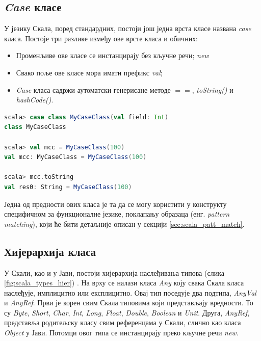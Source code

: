 \documentclass[12pt,oneside]{memoir}
\begin{document}
\subsection{\textit{Case} класе}
\label{subsec:scala_case_klase}

У језику Скала, поред стандардних, постоји још једна врста класе названа \textit{case} класа. Постоје три разлике између ове врсте класа и обичних:

\begin{itemize} 
\item Променљиве ове класе се инстанцирају без кључне речи; \textit{new}
\item Свако поље ове класе мора имати префикс \textit{val};
\item \textit{Case} класа садржи аутоматски генерисане методе $==$, \textit{toString()} и \textit{hashCode()}.
\end{itemize}

\begin{lstlisting}[language=Scala, caption={Пример коришћења \textit{case} класа}, label={lst:scala_oop_case_class_example}]
scala> case class MyCaseClass(val field: Int)
class MyCaseClass

scala> val mcc = MyCaseClass(100)
val mcc: MyCaseClass = MyCaseClass(100)

scala> mcc.toString
val res0: String = MyCaseClass(100)
\end{lstlisting}

Једна од предности ових класа је та да се могу користити у конструкту специфичном за функционалне језике, поклапању образаца (енг. \textit{pattern matching}), који ће бити детаљније описан у секцији \ref{sec:scala_patt_match}.

\subsection{Хијерархија класа}
\label{subsec:scala_class_hier}

У Скали, као и у Јави, постоји хијерархија наслеђивања типова (слика \ref{fig:scala_types_hier}) \cite{scala_prog}. На врху се налази класа \textit{Any} коју свака Скала класа наслеђује, имплицитно или експлицитно. Овај тип поседује два подтипа, \textit{AnyVal} и \textit{AnyRef}. Први је корен свим Скала типовима који представљају вредности. То су \textit{Byte}, \textit{Short}, \textit{Char}, \textit{Int}, \textit{Long}, \textit{Float}, \textit{Double}, \textit{Boolean} и \textit{Unit}. Друга, \textit{AnyRef}, представља родитељску класу свим референцама у Скали, слично као класа \textit{Object} у Јави. Потомци овог типа се инстанцирају преко кључне речи \textit{new}.
\end{document}
